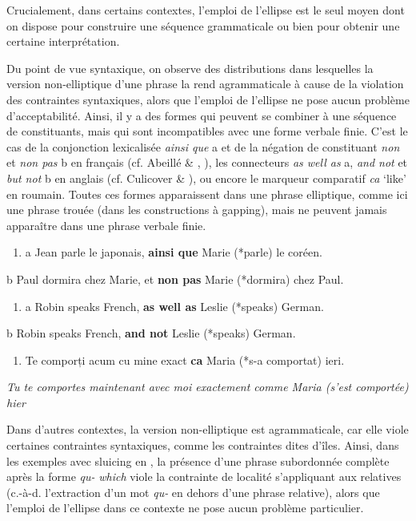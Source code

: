 Crucialement, dans certains contextes, l'emploi de l'ellipse est le seul moyen dont on dispose pour construire une séquence grammaticale ou bien pour obtenir une certaine interprétation. 

Du point de vue syntaxique, on observe des distributions dans lesquelles la version non-elliptique d'une phrase la rend agrammaticale à cause de la violation des contraintes syntaxiques, alors que l'emploi de l'ellipse ne pose aucun problème d'acceptabilité. Ainsi, il y a des formes qui peuvent se combiner à une séquence de constituants, mais qui sont incompatibles avec une forme verbale finie. C'est le cas de la conjonction lexicalisée \textit{ainsi que} a et de la négation de constituant \textit{non} et \textit{non pas} b en français (cf. Abeillé \& \citet{Godard1996}, \citet{Mouret2007}), les connecteurs \textit{as well as} a, \textit{and not} et \textit{but not} b en anglais (cf. Culicover \& \citet{Jackendoff2005}), ou encore le marqueur comparatif \textit{ca} `like'  en roumain. Toutes ces formes apparaissent dans une phrase elliptique, comme ici une phrase trouée (dans les constructions à gapping), mais ne peuvent jamais apparaître dans une phrase verbale finie.  


\begin{enumerate}
\item \label{bkm:Ref302495468}a  Jean parle le japonais, \textbf{ainsi que} Marie (*parle) le coréen. 


\end{enumerate}
  b  Paul dormira chez Marie, et \textbf{non pas} Marie (*dormira) chez Paul.


\begin{enumerate}
\item \label{bkm:Ref302495505}a  Robin speaks French, \textbf{as well as} Leslie (*speaks) German. 


\end{enumerate}
  b  Robin speaks French, \textbf{and not} Leslie (*speaks) German.


\begin{enumerate}
\item \label{bkm:Ref302495539}Te comporți acum cu mine exact \textbf{ca} Maria (*s-a comportat) ieri.


\end{enumerate}
{\itshape
  Tu te comportes maintenant avec moi exactement comme Maria (s'est comportée) hier}

Dans d'autres contextes, la version non-elliptique est agrammaticale, car elle viole certaines contraintes syntaxiques, comme les contraintes dites d'îles. Ainsi, dans les exemples avec sluicing en , la présence d'une phrase subordonnée complète après la forme \textit{qu-} \textit{which} viole la contrainte de localité s'appliquant aux relatives (c.-à-d. l'extraction d'un mot \textit{qu-} en dehors d'une phrase relative), alors que l'emploi de l'ellipse dans ce contexte ne pose aucun problème particulier.


